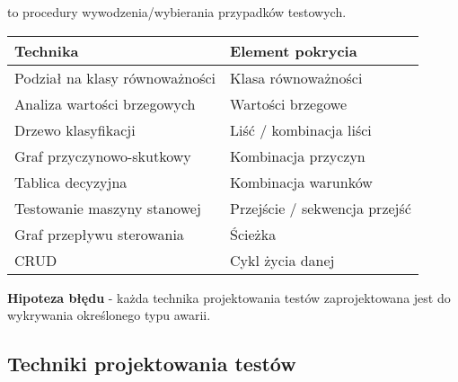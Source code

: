 \documentclass[../main.tex]{subfiles}
\begin{document}
    to procedury wywodzenia/wybierania przypadków testowych.

    \begin{tabular}{|p{8cm}||p{8cm}|}
        \hline
        \textbf{Technika}              & \textbf{Element pokrycia}     \\
        \hline
        \hline
        Podział na klasy równoważności & Klasa równoważności           \\
        \hline
        Analiza wartości brzegowych    & Wartości brzegowe             \\
        \hline
        Drzewo klasyfikacji            & Liść / kombinacja liści       \\
        \hline
        Graf przyczynowo-skutkowy      & Kombinacja przyczyn           \\
        \hline
        Tablica decyzyjna              & Kombinacja warunków           \\
        \hline
        Testowanie maszyny stanowej    & Przejście / sekwencja przejść \\
        \hline
        Graf przepływu sterowania      & Ścieżka                       \\
        \hline
        CRUD                           & Cykl życia danej              \\
        \hline
    \end{tabular}

    \textbf{Hipoteza błędu} - każda technika projektowania testów zaprojektowana jest do
    wykrywania określonego typu awarii.

    \subsection{Techniki projektowania testów}
\end{document}
